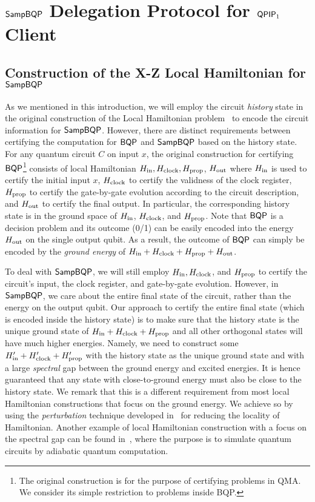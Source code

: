 \section{$\operatorname{\mathsf{SampBQP}}$ Delegation Protocol for $\operatorname{\mathsf{QPIP}}_1$ Client}
\label{sec:sampbqp}



\subsection{Construction of the X-Z Local Hamiltonian for $\operatorname{\mathsf{SampBQP}}$} \label{sec:LHXZ}
As we mentioned in this introduction, we will employ the circuit \emph{history} state in the original construction of the Local Hamiltonian problem~\cite{kitaev2002classical} to encode the circuit information for $\operatorname{\mathsf{SampBQP}}$.
However, there are distinct requirements between certifying the computation for $\operatorname{\mathsf{BQP}}$ and $\operatorname{\mathsf{SampBQP}}$ based on the history state.
For any quantum circuit $C$ on input $x$, the original construction for certifying $\operatorname{\mathsf{BQP}}$\footnote{The original construction is for the purpose of certifying problems in QMA. We consider its simple restriction to problems inside BQP.} consists of local Hamiltonian $H_{\mathrm{in}}, H_{\mathrm{clock}}, H_{\mathrm{prop}}$, $H_{\mathrm{out}}$ where $H_{\mathrm{in}}$ is used to certify the initial input $x$, $H_{\mathrm{clock}}$ to certify the validness of the clock register,  $H_{\mathrm{prop}}$ to certify the gate-by-gate evolution according to the circuit description, and $H_{\mathrm{out}}$ to certify the final output.
In particular, the corresponding history state is in the ground space of $H_{\mathrm{in}}$, $H_{\mathrm{clock}}$, and $H_{\mathrm{prop}}$. Note that $\operatorname{\mathsf{BQP}}$ is a decision problem and its outcome (0/1) can be easily encoded into the energy $H_{\mathrm{out}}$ on the single output qubit.
As a result, the outcome of $\operatorname{\mathsf{BQP}}$ can simply be encoded by the \emph{ground energy} of $H_{\mathrm{in}} + H_{\mathrm{clock}}+H_{\mathrm{prop}} + H_{\mathrm{out}}$.

To deal with $\operatorname{\mathsf{SampBQP}}$, we will still employ $H_{\mathrm{in}}, H_{\mathrm{clock}}$, and $H_{\mathrm{prop}}$ to certify the circuit's input, the clock register, and gate-by-gate evolution. However, in $\operatorname{\mathsf{SampBQP}}$, we care about the entire final state of the circuit, rather than the energy on the output qubit.
Our approach to certify the entire final state (which is encoded inside the history state) is to make sure that the history state is the unique ground state of $H_{\mathrm{in}} + H_{\mathrm{clock}}+ H_{\mathrm{prop}}$ and all other orthogonal states will have much higher energies.
Namely, we need to construct some $H_{\mathrm{in}}'+ H_{\mathrm{clock}}'+ H_{\mathrm{prop}}'$ with the history state as the unique ground state and with a large \emph{spectral} gap between the ground energy and excited energies.
It is hence guaranteed that any state with close-to-ground energy must also be close to the history state.
We remark that this is a different requirement from most local Hamiltonian constructions that focus on the ground energy.
We achieve so by using the \emph{perturbation} technique developed in~\cite{kempe_kitaev_regev_2006} for reducing the locality of Hamiltonian.
Another example of local Hamiltonian construction with a focus on the spectral gap can be found in~\cite{adiabatic}, where the purpose is to simulate quantum circuits by adiabatic quantum computation.

